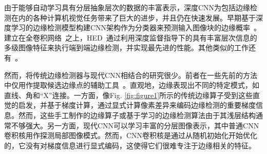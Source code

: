 \documentclass[10pt,twocolumn,letterpaper]{article}
\begin{document}
由于能够自动学习具有分层抽象层次的数据的丰富表示，深度CNN为包括边缘检测在内的各种计算机视觉任务带来了巨大的进步，并且仍在快速发展。早期基于深度学习的边缘检测模型构建CNN架构作为分类器来预测输入图像块的边缘概率~\cite{bertasius2015deepedge, shen2015deepcontour, bertasius2015hfl}。建立在全卷积网络~\cite{long2015fully}之上，HED~\cite{xie2017holistically}通过利用深度监督指导下的具有丰富层次信息的多级图像特征来执行端到端边缘检测，并实现最先进的性能。其他类似的工作还有~\cite{yang2016cedn, kokkinos2015deepboundary, maninis2016cob, wang2017ced, xu2018amhnet, liu2019richer, deng2018lpcb, he2019bidirectional}。

然而，将传统边缘检测器与现代CNN相结合的研究很少。前者在一些先前的方法中仅用作提取候选边缘点的辅助工具~\cite{bertasius2015hfl, bertasius2015deepedge}。直观地，边缘表现出不同的特定模式，如直线、角和“X”连接。一方面，像Fig. \ref{fig:figure1}所示的传统边缘算子受到这些直觉的启发，并基于梯度计算，通过显式计算像素差异来编码边缘检测的重要梯度信息。然而，这些手工制作的边缘算子或基于学习的边缘检测算法由于其浅层结构通常不够强大。另一方面，现代CNN可以学习丰富的分层图像表示，其中普通CNN卷积核用作探测局部图像模式。然而，CNN卷积核是通过从随机初始化开始优化的，它没有对梯度信息进行显式编码，这使得它们很难专注于边缘相关的特征。
\end{document}

